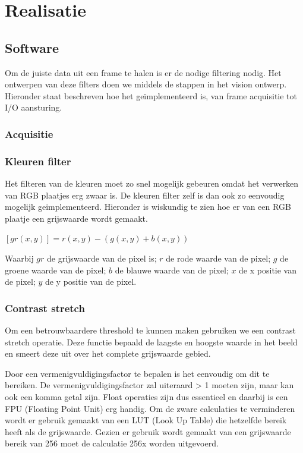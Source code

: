 \chapter{Realisatie}


\section{Software}
\label{sec:softreal}
Om de juiste data uit een frame te halen is er de nodige filtering nodig.
Het ontwerpen van deze filters doen we middels de stappen in het vision ontwerp.
Hieronder staat beschreven hoe het geïmplementeerd is, van frame acquisitie tot
I/O aansturing.

\subsection{Acquisitie}
\label{sub:acqreal}

\subsection{Kleuren filter}
\label{sub:kleurfilt}
Het filteren van de kleuren moet zo snel mogelijk gebeuren omdat het verwerken van 
RGB plaatjes erg zwaar is. De kleuren filter zelf is dan ook zo eenvoudig mogelijk 
geimplementeerd. Hieronder is wiskundig te zien hoe er van een RGB plaatje een 
grijswaarde wordt gemaakt.

$[gr(x, y)] = r(x, y) - (g(x, y) + b(x, y))$

Waarbij $gr$ de grijswaarde van de pixel is;
$r$ de rode waarde van de pixel;
$g$ de groene waarde van de pixel;
$b$ de blauwe waarde van de pixel;
$x$ de x positie van de pixel;
$y$ de y positie van de pixel.

\subsection{Contrast stretch}
\label{sub:contstr}
Om een betrouwbaardere threshold te kunnen maken gebruiken we een contrast stretch
operatie. Deze functie bepaald de laagste en hoogste waarde in het beeld en smeert
deze uit over het complete grijswaarde gebied.

Door een vermenigvuldigingsfactor te bepalen is het eenvoudig om dit te bereiken. De 
vermenigvuldigingsfactor zal uiteraard > 1 moeten zijn, maar kan ook een komma getal
zijn. Float operaties zijn dus essentieel en daarbij is een FPU (Floating Point Unit)
erg handig. Om de zware calculaties te verminderen wordt er gebruik gemaakt van een
LUT (Look Up Table) die hetzelfde bereik heeft als de grijswaarde. Gezien er gebruik
wordt gemaakt van een grijswaarde bereik van 256 moet de calculatie 256x worden
uitgevoerd.

